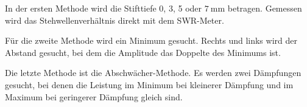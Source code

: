 In der ersten Methode wird die Stifttiefe 0, 3, 5 oder $\SI{7}{\milli\meter}$ betragen.
Gemessen wird das Stehwellenverhältnis direkt mit dem SWR-Meter.

Für die zweite Methode wird ein Minimum gesucht.
Rechts und links wird der Abstand gesucht, bei dem die Amplitude das Doppelte des Minimums ist.

Die letzte Methode ist die Abschwächer-Methode.
Es werden zwei Dämpfungen gesucht, bei denen die Leistung im Minimum bei kleinerer Dämpfung und im Maximum bei geringerer
Dämpfung gleich sind.
